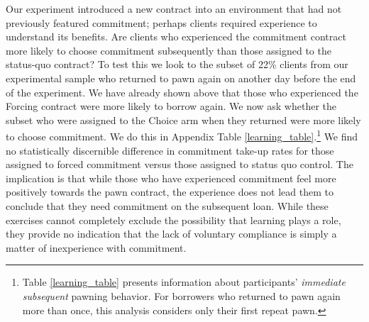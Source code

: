 \documentclass[12pt, a4paper]{article}
\begin{document}

Our experiment introduced a new contract into an environment that had not previously featured commitment; perhaps clients required experience to understand its benefits. Are clients who experienced the commitment contract more likely to choose commitment subsequently than those assigned to the status-quo contract? To test this we look to the subset of 22\% clients from our experimental sample who returned to pawn again on another day before the end of the experiment. We have already shown above that those who experienced the Forcing contract were more likely to borrow again.  We now ask whether the subset who were assigned to the Choice arm when they returned were more likely to choose commitment.  We do this in Appendix Table \ref{learning_table}.\footnote{Table \ref{learning_table} presents information about participants' \emph{immediate subsequent} pawning behavior.  For borrowers who returned to pawn again more than once, this analysis considers only their first repeat pawn.}
We find no statistically discernible difference in commitment take-up rates for those assigned to forced commitment versus those assigned to status quo control. The implication is that while those who have experienced commitment feel more positively towards the pawn contract, the experience does not lead them to conclude that they need commitment on the subsequent loan.  While these exercises cannot completely exclude the possibility that learning plays a role, they provide no indication that the lack of voluntary compliance is simply a matter of inexperience with commitment.


\end{document}
